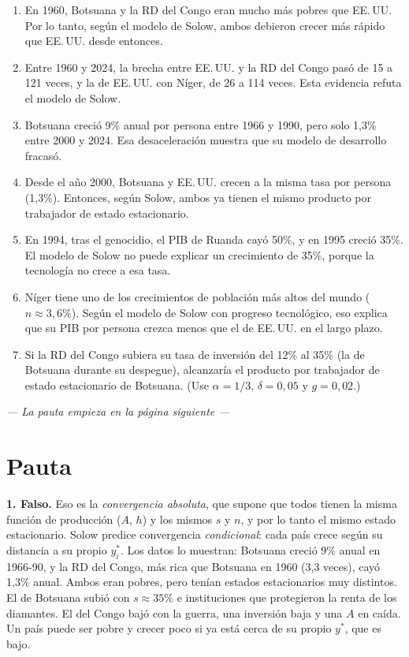\documentclass[11pt,letterpaper]{article}
\begin{document}
\begin{enumerate}
  \item En 1960, Botsuana y la RD del Congo eran mucho más pobres que EE.\,UU. Por lo tanto, según el modelo de Solow,
  ambos debieron crecer más rápido que EE.\,UU. desde entonces.
  \item Entre 1960 y 2024, la brecha entre EE.\,UU. y la RD del Congo pasó de 15 a 121 veces, y la de EE.\,UU. con Níger,
  de 26 a 114 veces. Esta evidencia refuta el modelo de Solow.
  \item Botsuana creció 9\% anual por persona entre 1966 y 1990, pero solo 1,3\% entre 2000 y 2024. Esa
  desaceleración muestra que su modelo de desarrollo fracasó.
  \item Desde el año 2000, Botsuana y EE.\,UU. crecen a la misma tasa por persona (1,3\%). Entonces, según Solow,
  ambos ya tienen el mismo producto por trabajador de estado estacionario.
  \item En 1994, tras el genocidio, el PIB de Ruanda cayó 50\%, y en 1995 creció 35\%. El modelo de Solow no puede
  explicar un crecimiento de 35\%, porque la tecnología no crece a esa tasa.
  \item Níger tiene uno de los crecimientos de población más altos del mundo ($n \approx 3{,}6\%$). Según el modelo
  de Solow con progreso tecnológico, eso explica que su PIB por persona crezca menos que el de EE.\,UU. en el largo
  plazo.
  \item Si la RD del Congo subiera su tasa de inversión del 12\% al 35\% (la de Botsuana durante su despegue),
  alcanzaría el producto por trabajador de estado estacionario de Botsuana. (Use $\alpha = 1/3$, $\delta = 0{,}05$
  y $g = 0{,}02$.)
\end{enumerate}

\vfill
\begin{center}\itshape --- La pauta empieza en la página siguiente ---\end{center}

\newpage
\section*{Pauta}

\textbf{1. Falso.} Eso es la \emph{convergencia absoluta}, que supone que todos tienen la misma función de producción
($A$, $h$) y los mismos $s$ y $n$, y por lo tanto el mismo estado estacionario. Solow predice convergencia
\emph{condicional}: cada país crece según su distancia a su propio $y_i^*$. Los datos lo muestran: Botsuana creció
9\% anual en 1966-90, y la RD del Congo, más rica que Botsuana en 1960 (3,3 veces), cayó 1,3\% anual. Ambos eran pobres, pero tenían
estados estacionarios muy distintos. El de Botsuana subió con $s \approx 35\%$ e instituciones que protegieron
la renta de los diamantes. El del Congo bajó con la guerra, una inversión baja y una $A$ en caída. Un país puede
ser pobre y crecer poco si ya está cerca de su propio $y^*$, que es bajo.
\end{document}
